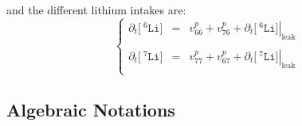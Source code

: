 \documentclass[aps,onecolumn,11pt]{revtex4}
\newcommand{\mychem}[1]{\mathtt{#1}}
\newcommand{\myconc}[1]{\big[#1\big]}
\newcommand{\spLi}[1]{{\!~^{#1}\mychem{Li}}}
\newcommand{\Li}[1]{\myconc{\spLi{#1}}}
\newcommand{\myleak}[1]{\left.{#1}\right\vert_{\mathrm{leak}}}
\begin{document}
and the different lithium intakes are:
\begin{equation}
\left\lbrace
\begin{array}{rcl}
	\partial_t \Li{6} & = & v^p_{66}+v^p_{76} + \partial_t \myleak{\Li{6}} \\ %
	\\
	\partial_t \Li{7} & = & v^p_{77}+v^p_{67} + \partial_t \myleak{\Li{7}} \\ %
\end{array}
\right.
\end{equation}

\subsection{Algebraic Notations}
\end{document}
